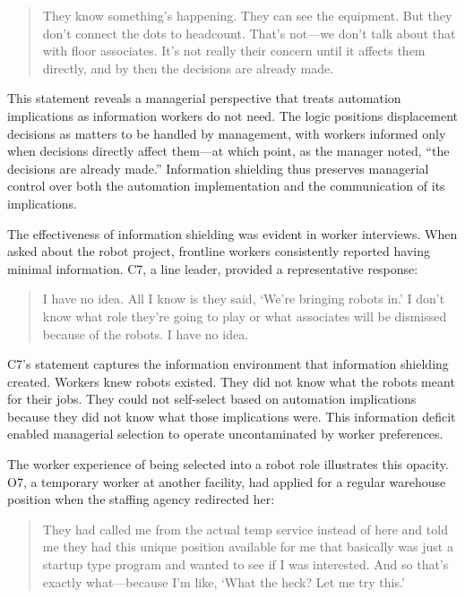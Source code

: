\documentclass[12pt]{article}
\begin{document}
\begin{quote}
They know something's happening. They can see the equipment. But they don't connect the dots to headcount. That's not---we don't talk about that with floor associates. It's not really their concern until it affects them directly, and by then the decisions are already made.
\end{quote}

This statement reveals a managerial perspective that treats automation implications as information workers do not need. The logic positions displacement decisions as matters to be handled by management, with workers informed only when decisions directly affect them---at which point, as the manager noted, ``the decisions are already made.'' Information shielding thus preserves managerial control over both the automation implementation and the communication of its implications.

The effectiveness of information shielding was evident in worker interviews. When asked about the robot project, frontline workers consistently reported having minimal information. C7, a line leader, provided a representative response:

\begin{quote}
I have no idea. All I know is they said, `We're bringing robots in.' I don't know what role they're going to play or what associates will be dismissed because of the robots. I have no idea.
\end{quote}

C7's statement captures the information environment that information shielding created. Workers knew robots existed. They did not know what the robots meant for their jobs. They could not self-select based on automation implications because they did not know what those implications were. This information deficit enabled managerial selection to operate uncontaminated by worker preferences.

The worker experience of being selected into a robot role illustrates this opacity. O7, a temporary worker at another facility, had applied for a regular warehouse position when the staffing agency redirected her:

\begin{quote}
They had called me from the actual temp service instead of here and told me they had this unique position available for me that basically was just a startup type program and wanted to see if I was interested. And so that's exactly what---because I'm like, `What the heck? Let me try this.'
\end{quote}
\end{document}
